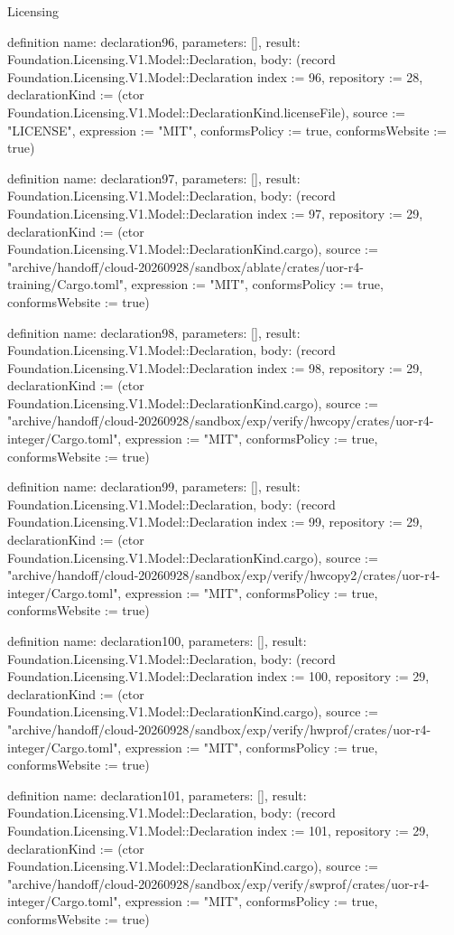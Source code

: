 \begin{lexlean}{Licensing}
\begin{semanticmodule}
definition{
  name: declaration96,
  parameters: [],
  result: Foundation.Licensing.V1.Model::Declaration,
  body: (record Foundation.Licensing.V1.Model::Declaration {index := 96, repository := 28, declarationKind := (ctor Foundation.Licensing.V1.Model::DeclarationKind.licenseFile), source := "LICENSE", expression := "MIT", conformsPolicy := true, conformsWebsite := true})
}

definition{
  name: declaration97,
  parameters: [],
  result: Foundation.Licensing.V1.Model::Declaration,
  body: (record Foundation.Licensing.V1.Model::Declaration {index := 97, repository := 29, declarationKind := (ctor Foundation.Licensing.V1.Model::DeclarationKind.cargo), source := "archive/handoff/cloud-20260928/sandbox/ablate/crates/uor-r4-training/Cargo.toml", expression := "MIT", conformsPolicy := true, conformsWebsite := true})
}

definition{
  name: declaration98,
  parameters: [],
  result: Foundation.Licensing.V1.Model::Declaration,
  body: (record Foundation.Licensing.V1.Model::Declaration {index := 98, repository := 29, declarationKind := (ctor Foundation.Licensing.V1.Model::DeclarationKind.cargo), source := "archive/handoff/cloud-20260928/sandbox/exp/verify/hwcopy/crates/uor-r4-integer/Cargo.toml", expression := "MIT", conformsPolicy := true, conformsWebsite := true})
}

definition{
  name: declaration99,
  parameters: [],
  result: Foundation.Licensing.V1.Model::Declaration,
  body: (record Foundation.Licensing.V1.Model::Declaration {index := 99, repository := 29, declarationKind := (ctor Foundation.Licensing.V1.Model::DeclarationKind.cargo), source := "archive/handoff/cloud-20260928/sandbox/exp/verify/hwcopy2/crates/uor-r4-integer/Cargo.toml", expression := "MIT", conformsPolicy := true, conformsWebsite := true})
}

definition{
  name: declaration100,
  parameters: [],
  result: Foundation.Licensing.V1.Model::Declaration,
  body: (record Foundation.Licensing.V1.Model::Declaration {index := 100, repository := 29, declarationKind := (ctor Foundation.Licensing.V1.Model::DeclarationKind.cargo), source := "archive/handoff/cloud-20260928/sandbox/exp/verify/hwprof/crates/uor-r4-integer/Cargo.toml", expression := "MIT", conformsPolicy := true, conformsWebsite := true})
}

definition{
  name: declaration101,
  parameters: [],
  result: Foundation.Licensing.V1.Model::Declaration,
  body: (record Foundation.Licensing.V1.Model::Declaration {index := 101, repository := 29, declarationKind := (ctor Foundation.Licensing.V1.Model::DeclarationKind.cargo), source := "archive/handoff/cloud-20260928/sandbox/exp/verify/swprof/crates/uor-r4-integer/Cargo.toml", expression := "MIT", conformsPolicy := true, conformsWebsite := true})
}


\end{semanticmodule}
\end{lexlean}
